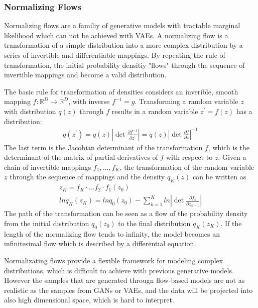 \documentclass[12pt,DIV14,BCOR12mm,a4paper,footinclude=false,headinclude,parskip=half-,twoside,openright,cleardoublepage=empty,toc=index,bibliography=totoc,listof=totoc]{scrreprt}
\numberwithin{equation}{chapter}
\begin{document}
\subsubsection{Normalizing Flows}
Normalizing flows\cite{rezende2016variational} are a familiy of generative models with tractable marginal likelihood which can not be achieved with VAEs. A normalizing flow is a transformation of a simple distribution into a more complex distribution by a series of invertible and differentiable mappings. By repeating the rule of transformation, the initial probability densitiy "flows" through the sequence of invertible mappings and become a valid distribution.

The basic rule for transformation of densities considers an inverible, smooth mapping $f: \mathbb{R}^{D} \rightarrow \mathbb{R}^{D}$, with inverse $f^{-1} = g$. Transforming a random variable $z$ with distribution $q(z)$ through $f$ results in a random variable $z^{'}  = f(z)$ has a distribution:
\begin{align}
  q(z^{'}) = q(z) \left| \det \frac{\partial f^{-1}}{\partial z^{'}} \right| = q(z) \left| \det \frac{\partial f}{\partial z} \right|^{-1}
\end{align}
The last term is the Jacobian determinant of the transformation $f$, which is the determinant of the matrix of partial derivatives of $f$ with respect to $z$. Given a chain of invertible mappings $f_{1},...,f_{K}$, the transformation of the random variable $z$ through the sequence of mappings and the density $q_{K}(z)$ can be written as
\begin{gather}
  z_{K} = f_{K} \cdot ... f_{2} \cdot f_{1}(z_{0})\\
  lnq_{K}(z_{K}) = lnq_{0}(z_{0}) - \sum_{k=1}^{K} ln \left| \det \frac{\partial f_{k}}{\partial z_{k-1}} \right|
\end{gather}
The path of the transformation can be seen as a flow of the probability density from the initial distribution $q_{0}(z_{0})$ to the final distribution $q_{K}(z_{K})$. If the length of the normalizing flow tends to infinity, the model becomes an infinitesimal flow which is described by a differential equation.

Normalizating flows provide a flexible framework for modeling complex distributions, which is difficult to achieve with previous generative models. However the samples that are generated througn flow-based models are not as realistic as the samples from GANs or VAEs, and the data will be projected into also high dimensional space, which is hard to interpret.
\end{document}
